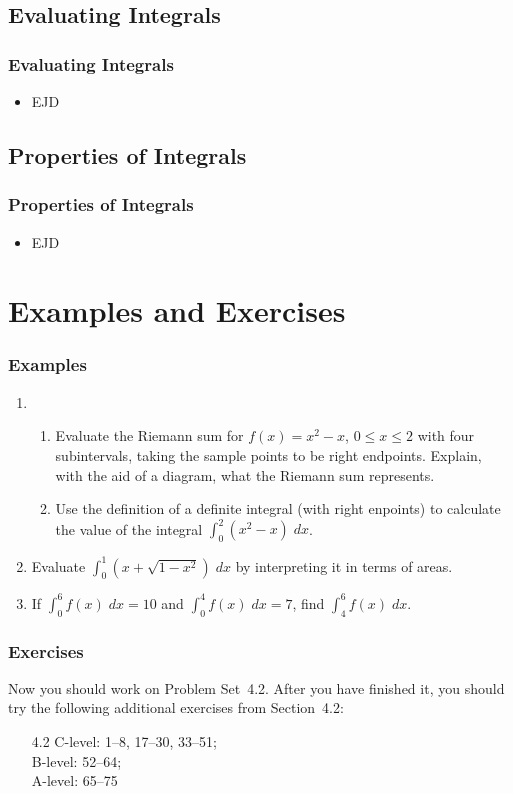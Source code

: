 \documentclass[serif,ignorenonframetext]{beamer}
\newcommand{\ds}{\displaystyle}
\begin{document}

\subsection{Evaluating Integrals}

\begin{frame}
  \frametitle{Evaluating Integrals}
  \begin{itemize}[<+->]
  \item EJD
  \end{itemize}
\end{frame}


\subsection{Properties of Integrals}

\begin{frame}
  \frametitle{Properties of Integrals}
  \begin{itemize}[<+->]
  \item EJD
  \end{itemize}
\end{frame}

\section{Examples and Exercises}

\begin{frame}
  \frametitle{Examples}
  \begin{enumerate}
  \item 
    \begin{enumerate}
    \item Evaluate the Riemann sum for $f(x)=x^2-x$, $0\le x\le 2$ with
      four subintervals, taking the sample points to be right endpoints.
      Explain, with the aid of a diagram, what the Riemann sum represents.
    \item Use the definition of a definite integral (with right enpoints)
      to calculate the value of the integral
      $\ds \int_0^2 (x^2-x) \; dx$.
    \end{enumerate}
  \item Evaluate
    $\ds \int_0^1 \left( x+\sqrt{1-x^2}\right) \; dx$
    by interpreting it in terms of areas.
  \item If $\ds \int_0^6 f(x) \; dx = 10$ and
    $\ds \int_0^4 f(x) \; dx = 7$, find $\ds \int_4^6 f(x) \; dx$.
  \end{enumerate} 
\end{frame}

\begin{frame}
  \frametitle{Exercises}
  Now you should work on Problem Set~4.2.  After you have finished it,
  you should try the following additional exercises from Section~4.2:
  \begin{itemize}
  \item[4.2]
    C-level: 1--8, 17--30, 33--51; \\
    B-level: 52--64; \\
    A-level: 65--75
  \end{itemize}
\end{frame}
\end{document}
